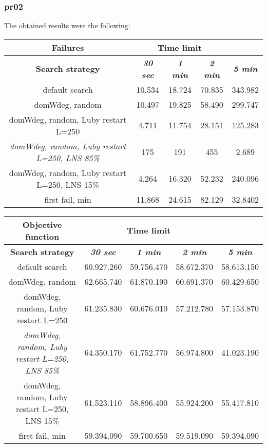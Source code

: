 \subsubsection{pr02}
The obtained results were the following:
{
\renewcommand{\arraystretch}{2}
\begin{longtable}[h]{| c | c | c | c | c |}
    \hline
    \textbf{Failures} & \multicolumn{3}{c}{Time limit} & \\
    \hline
    \textbf{Search strategy} & \textbf{\textit{30 sec}} & \textbf{\textit{1 min}} & \textbf{\textit{2 min}} & \textbf{\textit{5 min}} \\
    \hline
    \endhead
    default search                                         & 10.534 & 18.724 & 70.835 & 343.982 \\
    \hline
    domWdeg, random                                        & 10.497 & 19.825 & 58.490 & 299.747 \\
    \hline
    domWdeg, random, Luby restart L=250                    &  4.711 & 11.754 & 28.151 & 125.283 \\
    \hline
    \textit{domWdeg, random, Luby restart L=250, LNS 85\%} &   175 &   191 &   455 &   2.689 \\
    \hline
    domWdeg, random, Luby restart L=250, LNS 15\%          &  4.264 & 16.320 & 52.232 & 240.096 \\
    \hline
    first fail, min                                        & 11.868 & 24.615 & 82.129 & 32.8402 \\
    \hline
\end{longtable}
}

{
\renewcommand{\arraystretch}{2}
\begin{longtable}[h]{| c | c | c | c | c |}
    \hline
    \textbf{Objective function} & \multicolumn{3}{c}{Time limit} & \\
    \hline
    \textbf{Search strategy} & \textbf{\textit{30 sec}} & \textbf{\textit{1 min}} & \textbf{\textit{2 min}} & \textbf{\textit{5 min}} \\
    \hline
    \endhead
    default search                                         & 60.927.260 & 59.756.470 & 58.672.370 & 58.613.150 \\
    \hline
    domWdeg, random                                        & 62.665.740 & 61.870.190 & 60.691.370 & 60.429.650 \\
    \hline
    domWdeg, random, Luby restart L=250                    & 61.235.830 & 60.676.010 & 57.212.780 & 57.153.870 \\
    \hline
    \textit{domWdeg, random, Luby restart L=250, LNS 85\%} & 64.350.170 & 61.752.770 & 56.974.800 & 41.023.190 \\
    \hline
    domWdeg, random, Luby restart L=250, LNS 15\%          & 61.523.110 & 58.896.400 & 55.924.200 & 55.417.810 \\
    \hline
    first fail, min                                        & 59.394.090 & 59.700.650 & 59.519.090 & 59.394.090 \\
    \hline
\end{longtable}
}
